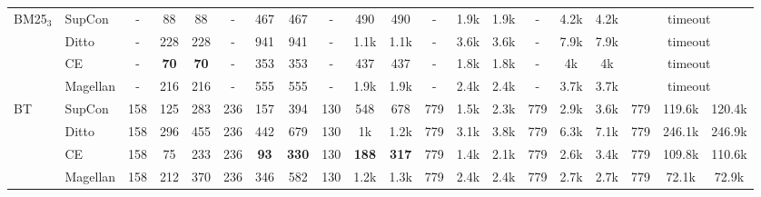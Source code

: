 \documentclass[sigconf,nonacm]{acmart}
\begin{document}
\begin{table*}[]
\begin{tabular}{@{}ll|ccc|ccc|ccc|ccc|ccc|ccc@{}}
BM25$_3$                & SupCon   & - & 88          & 88          & - & 467         & 467          & - & 490          & 490          & - & 1.9k         & 1.9k         & - & 4.2k         & 4.2k         & \multicolumn{3}{c}{timeout}           \\
 & Ditto    & - & 228         & 228         & - & 941         & 941          & - & 1.1k         & 1.1k         & - & 3.6k         & 3.6k         & - & 7.9k         & 7.9k         & \multicolumn{3}{c}{timeout}           \\
                     & CE       & - & \textbf{70} & \textbf{70} & - & 353         & 353          & - & 437          & 437          & - & 1.8k         & 1.8k         & - & 4k           & 4k           & \multicolumn{3}{c}{timeout}           \\
                     & Magellan & - & 216         & 216         & - & 555         & 555          & - & 1.9k         & 1.9k         & - & 2.4k         & 2.4k         & - & 3.7k         & 3.7k         & \multicolumn{3}{c}{timeout}           \\ \midrule
BT                   & SupCon   & 158                   & 125         & 283         & 236                   & 157         & 394          & 130                   & 548          & 678          & 779                   & 1.5k         & 2.3k         & 779                   & 2.9k         & 3.6k         & 779 & 119.6k         & 120.4k         \\
                     & Ditto    & 158                   & 296         & 455         & 236                   & 442         & 679          & 130                   & 1k           & 1.2k         & 779                   & 3.1k         & 3.8k         & 779                   & 6.3k         & 7.1k         & 779 & 246.1k         & 246.9k         \\
 & CE       & 158                   & 75          & 233         & 236                   & \textbf{93} & \textbf{330} & 130                   & \textbf{188} & \textbf{317} & 779                   & 1.4k         & 2.1k         & 779                   & 2.6k         & 3.4k         & 779 & 109.8k         & 110.6k         \\
 & Magellan & 158                   & 212         & 370         & 236                   & 346         & 582          & 130                   & 1.2k         & 1.3k         & 779                   & 2.4k         & 2.4k         & 779                   & 2.7k         & 2.7k         & 779 & 72.1k          & 72.9k    
   \\ 
\bottomrule
\end{tabular}
\end{table*}
\end{document}
